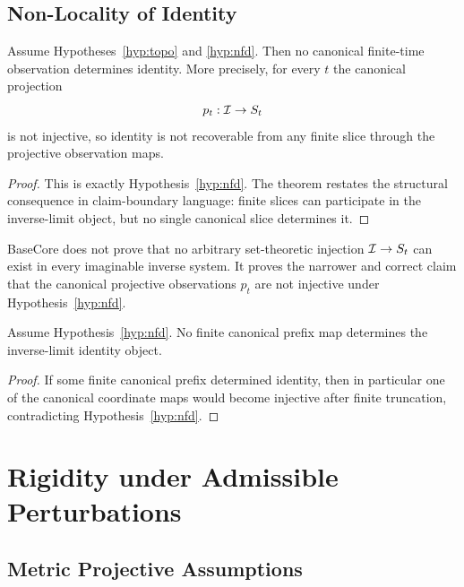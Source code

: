 \subsection{Non-Locality of Identity}

\begin{theorem}\label{prop:nonlocality}
Assume Hypotheses~\ref{hyp:topo} and \ref{hyp:nfd}. Then no canonical finite-time observation determines identity. More precisely, for every $t$ the canonical projection
\[
p_t:\mathcal{I}\to S_t
\]
is not injective, so identity is not recoverable from any finite slice through the projective observation maps.
\end{theorem}

\begin{proof}
This is exactly Hypothesis~\ref{hyp:nfd}. The theorem restates the structural consequence in claim-boundary language: finite slices can participate in the inverse-limit object, but no single canonical slice determines it.
\end{proof}

\begin{remark}
BaseCore does not prove that no arbitrary set-theoretic injection $\mathcal{I}\to S_t$ can exist in every imaginable inverse system. It proves the narrower and correct claim that the canonical projective observations $p_t$ are not injective under Hypothesis~\ref{hyp:nfd}.
\end{remark}

\begin{proposition}\label{thm:noprogressive}
Assume Hypothesis~\ref{hyp:nfd}. No finite canonical prefix map determines the inverse-limit identity object.
\end{proposition}

\begin{proof}
If some finite canonical prefix determined identity, then in particular one of the canonical coordinate maps would become injective after finite truncation, contradicting Hypothesis~\ref{hyp:nfd}.
\end{proof}

\section{Rigidity under Admissible Perturbations}

\subsection{Metric Projective Assumptions}

